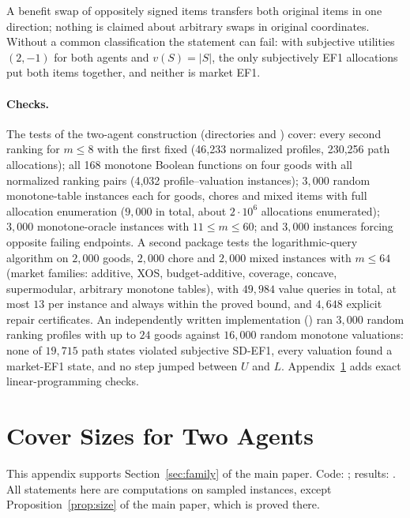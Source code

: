 \documentclass[11pt]{article}
\theoremstyle{definition}
\begin{document}
A benefit swap of oppositely signed items transfers both original items in one direction; nothing is claimed about arbitrary swaps in original coordinates. Without a common classification the statement can fail: with subjective utilities $(2,-1)$ for both agents and $v(S)=|S|$, the only subjectively EF1 allocations put both items together, and neither is market EF1.

\paragraph{Checks.}
The tests of the two-agent construction (directories  and ) cover: every second ranking for $m\le8$ with the first fixed (46{,}233 normalized profiles, 230{,}256 path allocations); all 168 monotone Boolean functions on four goods with all normalized ranking pairs (4{,}032 profile--valuation instances); $3{,}000$ random monotone-table instances each for goods, chores and mixed items with full allocation enumeration ($9{,}000$ in total, about $2\cdot10^6$ allocations enumerated); $3{,}000$ monotone-oracle instances with $11\le m\le60$; and $3{,}000$ instances forcing opposite failing endpoints. A second package tests the logarithmic-query algorithm on $2{,}000$ goods, $2{,}000$ chore and $2{,}000$ mixed instances with $m\le64$ (market families: additive, XOS, budget-additive, coverage, concave, supermodular, arbitrary monotone tables), with $49{,}984$ value queries in total, at most $13$ per instance and always within the proved bound, and $4{,}648$ explicit repair certificates. An independently written implementation () ran $3{,}000$ random ranking profiles with up to $24$ goods against $16{,}000$ random monotone valuations: none of $19{,}715$ path states violated subjective SD-EF1, every valuation found a market-EF1 state, and no step jumped between $U$ and $L$. Appendix~\ref{app:family} adds exact linear-programming checks.

\section{Cover Sizes for Two Agents}\label{app:family}
This appendix supports Section~\ref{sec:family} of the main paper. Code: ; results: . All statements here are computations on sampled instances, except Proposition~\ref{prop:size} of the main paper, which is proved there.
\end{document}
